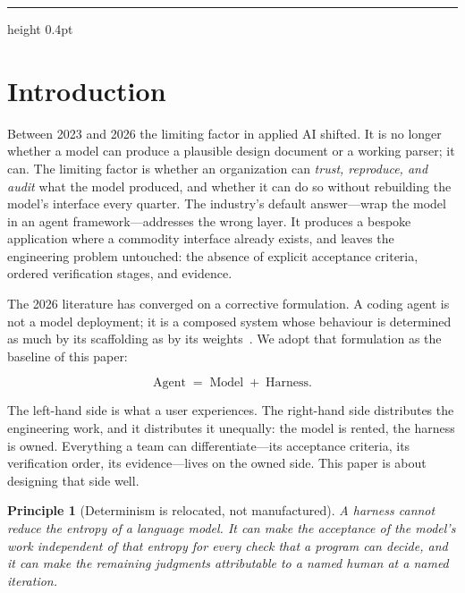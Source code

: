 \documentclass[10pt,a4paper]{article}
\theoremstyle{definition}
\theoremstyle{plain}
\theoremstyle{principle}
\newtheorem{principle}{Principle}[section]
\begin{document}
\vspace{4pt}
{\color{line}\hrule height 0.4pt}

\section{Introduction}\label{sec:intro}

Between 2023 and 2026 the limiting factor in applied AI shifted. It is no longer whether a model
can produce a plausible design document or a working parser; it can. The limiting factor is
whether an organization can \emph{trust, reproduce, and audit} what the model produced, and
whether it can do so without rebuilding the model's interface every quarter. The industry's
default answer---wrap the model in an agent framework---addresses the wrong layer. It produces a
bespoke application where a commodity interface already exists, and leaves the engineering
problem untouched: the absence of explicit acceptance criteria, ordered verification stages, and
evidence.

The 2026 literature has converged on a corrective formulation. A coding agent is not a model
deployment; it is a composed system whose behaviour is determined as much by its scaffolding as
by its weights~\cite{barbaste2026,meng2026}. We adopt that formulation as the baseline of this
paper:

\begin{equation}
\text{Agent} \;=\; \text{Model} \;+\; \text{Harness}.
\label{eq:baseline}
\end{equation}

\noindent
The left-hand side is what a user experiences. The right-hand side distributes the engineering
work, and it distributes it unequally: the model is rented, the harness is owned. Everything a
team can differentiate---its acceptance criteria, its verification order, its evidence---lives on
the owned side. This paper is about designing that side well.

\begin{principle}[Determinism is relocated, not manufactured]\label{pr:relocate}
A harness cannot reduce the entropy of a language model. It can make the \emph{acceptance} of the
model's work independent of that entropy for every check that a program can decide, and it can
make the remaining judgments attributable to a named human at a named iteration.
\end{principle}
\end{document}

